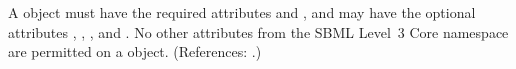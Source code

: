 A \SpeciesReference object must have the required attributes
 and , and may have the optional attributes
, , ,  and
.  No other attributes from the SBML Level~3 Core
namespace are permitted on a \SpeciesReference object.  (References: .)
